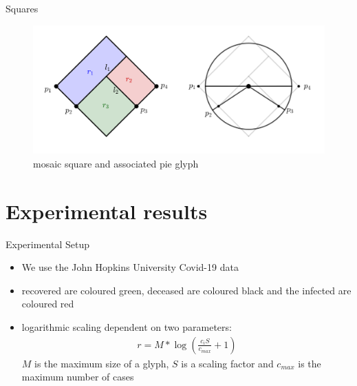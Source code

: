 \documentclass{beamer}
\begin{document}
\begin{frame}{Squares}
  
  \begin{figure}[h]
    \centering
      \includegraphics[width=0.9\linewidth]{assets/square_bloat.png}
      \caption{mosaic square and associated pie glyph}
  \end{figure}
\end{frame}

\section{Experimental results}

\begin{frame}{Experimental Setup}
  \begin{itemize}
    \item We use the John Hopkins University Covid-19 data
    \item recovered are coloured green, deceased are coloured black and		the infected are coloured red
    \item logarithmic scaling dependent on two parameters:
      \begin{align*}
	r=M* \log \left( \frac{c_i S}{c_{max}} +1 \right)
      \end{align*}
      $M$ is the maximum size of a glyph, $S$ is a scaling factor and $c_{max}$ is			the maximum number of cases
  \end{itemize}
\end{frame}
\end{document}

